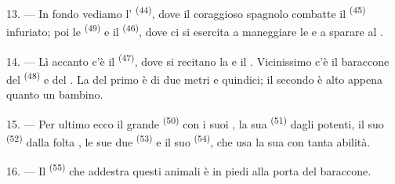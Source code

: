 13. --- In fondo vediamo l' \textsuperscript{(44)}, dove il coraggioso
 spagnolo combatte il  \textsuperscript{(45)}
infuriato; poi le  \textsuperscript{(49)} e il  \textsuperscript{(46)}, dove ci si esercita a maneggiare le  e a sparare al .

14. --- Lì accanto c'è il  \textsuperscript{(47)}, dove si
recitano la  e il . Vicinissimo c'è il baraccone del
 \textsuperscript{(48)} e del . La  del
primo è di due metri e quindici; il secondo è alto appena quanto un bambino.

15. --- Per ultimo ecco il grande  \textsuperscript{(50)} con i suoi
, la sua  \textsuperscript{(51)} dagli
 potenti, il suo  \textsuperscript{(52)} dalla folta
, le sue due  \textsuperscript{(53)} e il suo
 \textsuperscript{(54)}, che usa la sua  con tanta
abilità.

16. --- Il  \textsuperscript{(55)} che addestra questi animali è in
piedi alla porta del baraccone.
\VUsaut{6.0mm}
\VUfilet{22mm}

